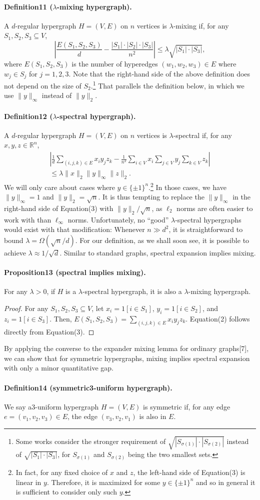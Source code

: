 \paragraph{Definition11 ($\lambda$-mixing hypergraph).} A $d$-regular hypergraph $H=(V,E)$ on $n$ vertices is $\lambda$-mixing if, for any $S_1,S_2,S_3\subseteq V$,
\[\left|\frac{E(S_1,S_2,S_3)}d-\frac{|S_1|\cdot|S_2|\cdot|S_3|}{n^2}\right|\leq\lambda\sqrt{|S_1|\cdot|S_3|},\tag{2}\]
where $E(S_1,S_2,S_3)$ is the number of hyperedges $(w_1,w_2,w_3)\in E$ where $w_j\in S_j$ for $j=1,2,3$.
Note that the right-hand side of the above definition does not depend on the size of $S_2$.\footnote{Some works consider the stronger requirement of $\sqrt{|S_{\sigma(1)}|\cdot|S_{\sigma(2)}|}$ instead of $\sqrt{|S_1|\cdot|S_3|}$, for $S_{\sigma(1)}$ and $S_{\sigma(2)}$ being the two smallest sets.} That parallels the definition below, in which we use $\|y\|_{\infty}$ instead of $\|y\|_2$.
\paragraph{Definition12 ($\lambda$-spectral hypergraph).} A $d$-regular hypergraph $H=(V,E)$ on $n$ vertices is $\lambda$-spectral if, for any $x,y,z\in\mathbb R^n$,
\begin{multline*}
\left|\frac1d\sum_{(i,j,k)\in E}x_iy_jz_k-\frac1{n^2}\sum_{i\in V}x_i\sum_{j\in V}y_j\sum_{k\in V}z_k\right|\\
\leq\lambda\|x\|_2\|y\|_{\infty}\|z\|_2.\tag{3}
\end{multline*}
We will only care about cases where $y\in\{\pm1\}^n$.\footnote{In fact, for any fixed choice of $x$ and $z$, the left-hand side of Equation(3) is linear in $y$. Therefore, it is maximized for some $y\in\{\pm1\}^n$ and so in general it is sufficient to consider only such $y$.} In those cases, we have $\|y\|_{\infty}=1$ and $\|y\|_2=\sqrt n$. It is thus tempting to replace the $\|y\|_{\infty}$ in the right-hand side of Equation(3) with $\|y\|_2/\sqrt n$, as $\ell_2$ norms are often easier to work with than $\ell_{\infty}$ norms. Unfortunately, no ``good'' $\lambda$-spectral hypergraphs would exist with that modification: Whenever $n\gg d^2$, it is straightforward to bound $\lambda=\Omega(\sqrt n/d)$. For our definition, as we shall soon see, it is possible to achieve $\lambda\approx1/\sqrt d$.
Similar to standard graphs, spectral expansion implies mixing.
\paragraph{Proposition13 (spectral implies mixing).} For any $\lambda>0$, if $H$ is a $\lambda$-spectral hypergraph, it is also a $\lambda$-mixing hypergraph.
\begin{proof}
For any $S_1,S_2,S_3\subseteq V$, let $x_i=1[i\in S_1]$, $y_i=1[i\in S_2]$, and $z_i=1[i\in S_3]$. Then, $E(S_1,S_2,S_3)=\sum_{(i,j,k)\in E}x_iy_jz_k$. Equation(2) follows directly from Equation(3).
\end{proof}
By applying the converse to the expander mixing lemma for ordinary graphs[7], we can show that for symmetric hypergraphs, mixing implies spectral expansion with only a minor quantitative gap.
\paragraph{Definition14 (symmetric3-uniform hypergraph).} We say a3-uniform hypergraph $H=(V,E)$ is symmetric if, for any edge $e=(v_1,v_2,v_3)\in E$, the edge $(v_3,v_2,v_1)$ is also in $E$.
